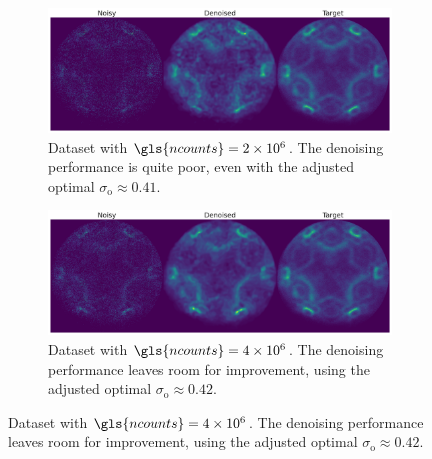 \begin{figure}
    \centering

    \begin{subfigure}[b]{1\linewidth}
        \centering
        \includegraphics[width=1\linewidth]{images/noisy_denoised_ref_2M_avg_bm3d.pdf}
        \caption{Dataset with $\gls{ncounts}=\num{2e6}$. The denoising performance is quite poor, even with the adjusted optimal $\sigma_{\text{o}}\approx0.41$.}
        \label{fig:noisy-denoised-ref-2M-avg-bm3d}
    \end{subfigure}

    \begin{subfigure}[b]{1\linewidth}
        \centering
        \includegraphics[width=1\linewidth]{images/noisy_denoised_ref_4M_avg_bm3d.pdf}
        \caption{Dataset with $\gls{ncounts}=\num{4e6}$. The denoising performance leaves room for improvement, using the adjusted optimal $\sigma_{\text{o}}\approx0.42$.}
        \label{fig:noisy-denoised-ref-4M-avg-bm3d}
    \end{subfigure}


\end{figure}
